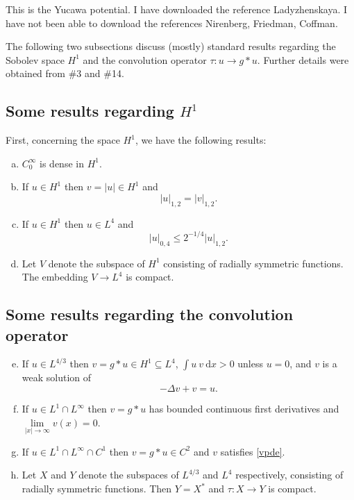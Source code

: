 \documentclass{article}
\newcommand{\be}{\begin{equation}}
\newcommand{\ee}{\end{equation}}
\newcommand{\done}{\color{OliveGreen}}
\newcommand{\rewrite}{\color{Goldenrod}}
\newcommand{\new}{\color{NavyBlue}}
\numberwithin{equation}{section}
\begin{document}
{\new This is the Yucawa potential. I have downloaded the reference Ladyzhenskaya. I have not been able to download the references Nirenberg, Friedman, Coffman.}

The following two subsections discuss (mostly) standard results regarding the Sobolev space $H^1$ and the convolution operator $\tau: u \to g\ast u$. Further details were obtained from \#3 and \#14.

\subsection{Some results regarding $H^1$}
{\rewrite First, concerning the space $H^1$, we have the following results:}
{\done \begin{enumerate}[a)]
\item $C^\infty_0$ is dense in $H^1$.
\item If $u\in H^1$ then $v=|u|\in H^1$ and
$$|u|_{1,2}=|v|_{1,2}.$$
\item If $u\in H^1$ then $u\in L^4$ and
\be|u|_{0,4} \leq 2^{-1/4}|u|_{1,2}.\ee
\item Let $V$ denote the subspace of $H^1$ consisting of radially symmetric functions. The embedding $V \to L^4$ is compact.
\end{enumerate}}

\subsection{Some results regarding the convolution operator}
{\new \begin{enumerate}[a)]
\setcounter{enumi}{4}
\item If $u\in L^{4/3}$ then $v = g\ast u \in H^1\subseteq L^4$, $\int u~v~\mathrm{d} x>0$ unless $u=0$, and $v$ is a weak solution of 
\be \label{vpde} -\Delta v + v = u. \ee
\item If $u \in L^1\cap L^\infty$ then $v = g\ast u$ has bounded continuous first derivatives and 
$\underset{|x|\to\infty}{\lim} v(x) = 0$.
\item If $u\in L^1\cap L^\infty\cap C^1$ then $v = g\ast u\in C^2$ and $v$ satisfies \eqref{vpde}.
\item Let $X$ and $Y$ denote the subspaces of $L^{4/3}$ and $L^4$ respectively, consisting of radially symmetric functions. Then $Y = X^\ast$ and $\tau : X \to Y$ is compact.
\end{enumerate}}

\end{document}
